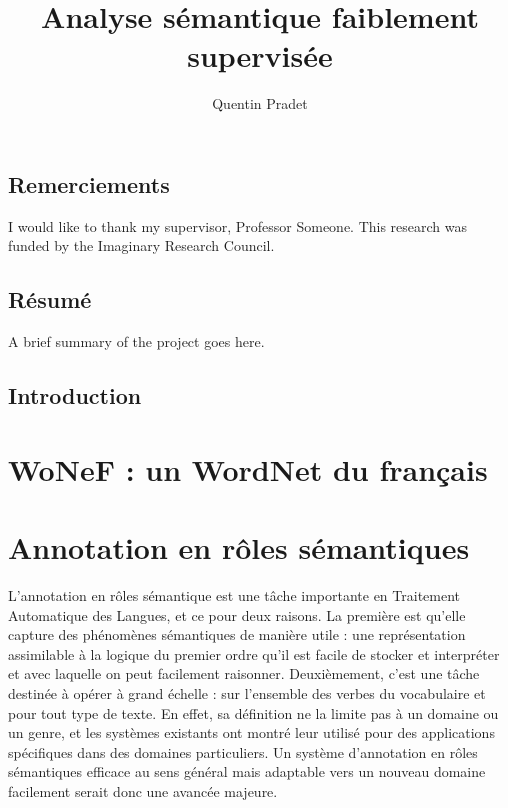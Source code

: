 \documentclass[oneside]{scrbook}
\title{Analyse sémantique faiblement supervisée}
\author{Quentin Pradet}
\date{}
\begin{document}
 

\maketitle 

\frontmatter 
\tableofcontents 
\listoffigures 
\listoftables 

\chapter{Remerciements} 

I would like to thank my supervisor, Professor Someone. This 
research was funded by the Imaginary Research Council. 

\chapter{Résumé} 

A brief summary of the project goes here. 


\mainmatter 

\chapter{Introduction} 
\label{ch:intro} 



\part{WoNeF : un WordNet du français}



\part{Annotation en rôles sémantiques}

L'annotation en rôles sémantique est une tâche importante en Traitement Automatique des Langues, et ce pour deux raisons. La première est qu'elle capture des phénomènes sémantiques de manière utile : une représentation assimilable à la logique du premier ordre qu'il est facile de stocker et interpréter et avec laquelle on peut facilement raisonner. Deuxièmement, c'est une tâche destinée à opérer à grand échelle : sur l'ensemble des verbes du vocabulaire et pour tout type de texte. En effet, sa définition ne la limite pas à un domaine ou un genre, et les systèmes existants ont montré leur utilisé pour des applications spécifiques dans des domaines particuliers. Un système d'annotation en rôles sémantiques efficace au sens général mais adaptable vers un nouveau domaine facilement serait donc une avancée majeure.
\end{document}
